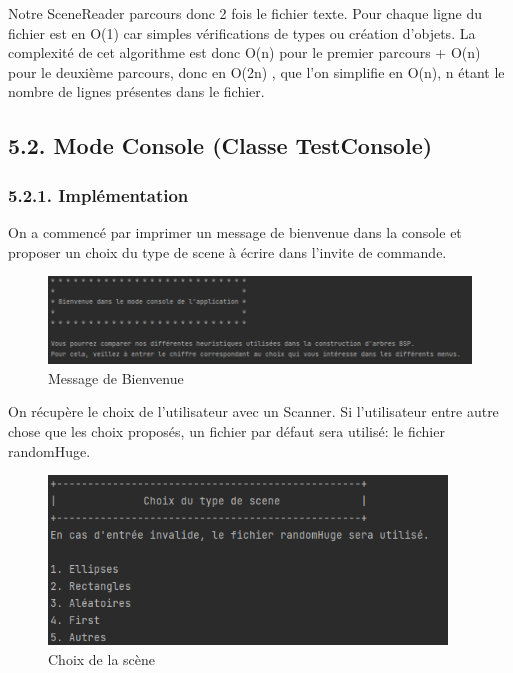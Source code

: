 \documentclass[a4paper,12pt]{report}	%
\begin{document}
    Notre SceneReader parcours donc 2 fois le fichier texte. Pour chaque ligne du fichier est en O(1) car simples vérifications de types ou création d'objets. La complexité de cet algorithme est donc O(n) pour le premier parcours + O(n) pour le deuxième parcours, donc en O(2n) , que l'on simplifie en O(n), n étant le nombre de lignes présentes dans le fichier.\\
	
	\newpage
	
	{\subsection*{5.2. Mode Console (Classe TestConsole)}}
	
	{\subsubsection*{5.2.1. Implémentation}}
	  On a commencé par imprimer un message de bienvenue dans la console et proposer un choix du type de scene à écrire dans l'invite de commande. \\
\begin{figure}[H]
\begin{center}
  \includegraphics[width=500px]{welcome.png}
  \caption{Message de Bienvenue}\label{fig:PERT}
\end{center}
\end{figure}
\indent On récupère le choix de l'utilisateur avec un Scanner. Si l'utilisateur entre autre chose que les choix proposés, un fichier par défaut sera utilisé: le fichier randomHuge. \\
\begin{figure}[H]
\begin{center}
  \includegraphics[width=400px]{sceneChoice.png}
  \caption{Choix de la scène}\label{fig:PERT}
\end{center}
\end{figure}
\end{document}
